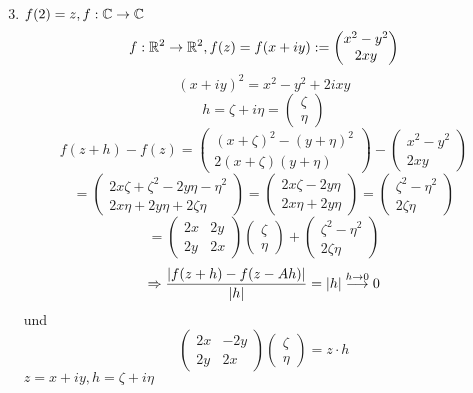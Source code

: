 \documentclass[../ana2.tex]{subfiles}
\begin{document}
\begin{bsp}\leavevmode
    \begin{enumerate}
        \setcounter{enumi}{2}
        \item \( f(2) = z, f:\mathbb{C}\rightarrow \mathbb{C} \)
        \[ f:\mathbb{R}^2\rightarrow \mathbb{R}^2, f(z) = f(x+iy) := \begin{pmatrix}
            x^2-y^2 \\
            2xy
        \end{pmatrix}\]
        \[ (x+iy)^2 = x^2 - y^2 + 2ixy \]
        \[ h = \zeta + i \eta = \begin{pmatrix}
            \zeta \\
            \eta
        \end{pmatrix} \]
        \[ f(z + h) - f(z) = \begin{pmatrix}
            (x + \zeta)^2 - (y + \eta)^2\\
            2 (x+\zeta)(y + \eta)
        \end{pmatrix} - \begin{pmatrix}
            x^2 - y^2\\
            2xy
        \end{pmatrix} \]
        \[ = \begin{pmatrix}
            2x\zeta + \zeta^2 - 2y\eta - \eta^2\\
            2x\eta + 2y\eta + 2\zeta \eta
        \end{pmatrix} = \begin{pmatrix}
            2x \zeta - 2y \eta \\
            2x\eta + 2y \eta 
        \end{pmatrix} = \begin{pmatrix}
            \zeta^2 - \eta^2 \\
            2 \zeta \eta
        \end{pmatrix} \]
        \[ = \begin{pmatrix}
            2x & 2y\\
            2y & 2x
        \end{pmatrix} \begin{pmatrix}
            \zeta\\ \eta
        \end{pmatrix} + \begin{pmatrix}
            \zeta^2 - \eta^2\\
            2\zeta \eta
        \end{pmatrix} \]        
        \[ \Rightarrow \frac{\left|f(z+h) - f(z - Ah)\right|}{\left|h\right|}
        = \left|h\right| \overset{h \rightarrow 0}{\longrightarrow} 0 \]
        und \[ \begin{pmatrix}
            2x & -2y\\
            2y & 2x
        \end{pmatrix} \begin{pmatrix}
            \zeta \\ \eta
        \end{pmatrix}
        = z \cdot h \]
        \( z = x + iy, h = \zeta + i \eta \)
    \end{enumerate}
\end{bsp}
\end{document}
